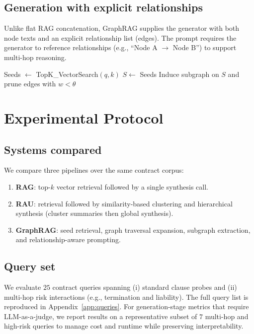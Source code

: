 \documentclass[11pt]{article}
\begin{document}
\subsection{Generation with explicit relationships}
Unlike flat RAG concatenation, GraphRAG supplies the generator with both node texts and an explicit relationship list (edges). The prompt requires the generator to reference relationships (e.g., ``Node A $\rightarrow$ Node B'') to support multi-hop reasoning.

\begin{algorithm}[t]
\caption{GraphRAG retrieval (simplified)}
Seeds $\leftarrow$ TopK\_VectorSearch$(q,k)$\;
$S \leftarrow$ Seeds\;
Induce subgraph on $S$ and prune edges with $w < \theta$\;
\;
\end{algorithm}

\section{Experimental Protocol}
\subsection{Systems compared}
We compare three pipelines over the same contract corpus:
\begin{enumerate}[leftmargin=*]
  \item \textbf{RAG}: top-$k$ vector retrieval followed by a single synthesis call.
  \item \textbf{RAU}: retrieval followed by similarity-based clustering and hierarchical synthesis (cluster summaries then global synthesis).
  \item \textbf{GraphRAG}: seed retrieval, graph traversal expansion, subgraph extraction, and relationship-aware prompting.
\end{enumerate}

\subsection{Query set}
We evaluate $25$ contract queries spanning (i) standard clause probes and (ii) multi-hop risk interactions (e.g., termination and liability). The full query list is reproduced in Appendix~\ref{app:queries}. For generation-stage metrics that require LLM-as-a-judge, we report results on a representative subset of $7$ multi-hop and high-risk queries to manage cost and runtime while preserving interpretability.
\end{document}
